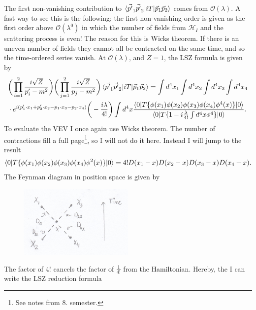 \begin{example}
\begin{enumerate}
		The first non-vanishing contribution to $\braket{\vec{p'}_1\vec{p'}_2|iT|\vec{p}_1\vec{p}_2}$ comes from $\mathcal{O}(\lambda)$. A fast way to see this is the following; the first non-vanishing order is given as the first order above $\mathcal{O}(\lambda^0)$ in which the number of fields from $\mathcal{H}_I$ and the scattering process is even! The reason for this is Wicks theorem. If there is an uneven number of fields they cannot all be contracted on the same time, and so the time-ordered series vanish. At $\mathcal{O}(\lambda)$, and $Z=1$, the LSZ formula is given by
		\begin{equation}
			\begin{split}
				&\bigg(\prod_{i=1}^{2}\frac{i\sqrt{Z}}{p'_i-m^2}\bigg)\bigg(\prod_{j=1}^{2}\frac{i\sqrt{Z}}{p_j-m^2}\bigg)\braket{\vec{p'}_1\vec{p'}_2|iT|\vec{p}_1\vec{p}_2}=\int d^4x_1\int d^4x_2\int d^4x_3\int d^4x_4\\
				&\cdot e^{i(p'_1\cdot x_1+p'_2\cdot x_2-p_1\cdot x_3-p_2\cdot x_4)}\bigg(-\frac{i\lambda}{4!}\bigg)\int d^4x	\frac{\braket{0|T\{\phi(x_1)\phi(x_2)\phi(x_3)\phi(x_4)\phi^4(x)\}|0}}{\braket{0|T\{1-i\frac{\lambda}{4!}\int d^4x \phi^4\}|0}}.
			\end{split}
		\end{equation} 
		To evaluate the VEV I once again use Wicks theorem. The number of contractions fill a full page\footnote{See notes from 8. semester.}, so I will not do it here. Instead I will jump to the result
		\begin{equation}
			\braket{0|T\{\phi(x_1)\phi(x_2)\phi(x_3)\phi(x_4)\phi^2(x)\}|0}=4!D(x_1-x)D(x_2-x)D(x_3-x)D(x_4-x).
		\end{equation} 
		The Feynman diagram in position space is given by
		\begin{figure}[H]
			\captionsetup{width=1\textwidth}
			\centering
			\includegraphics[width=0.5\textwidth]{figures/scal1}
		\end{figure}
		The factor of $4!$ cancels the factor of $\frac{1}{4!}$ from the Hamiltonian. Hereby, the I can write the LSZ reduction formula
		\begin{equation}

\end{equation}
\end{enumerate}
\end{example}
